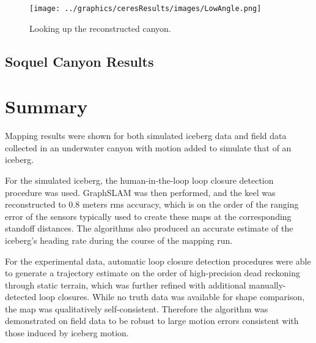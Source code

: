  \begin{figure}[!htb]
   \centering
   \texttt{[image: ../graphics/ceresResults/images/LowAngle.png]} %
   \caption{Looking up the reconstructed canyon.}
   \label{fig:RealDataSolution5}
\end{figure}
\subsection{Soquel Canyon Results}


\section{Summary}

Mapping results were shown for both simulated iceberg data and field data collected in an underwater canyon with motion added to simulate that of an iceberg. 

For the simulated iceberg, the human-in-the-loop loop closure detection procedure was used. GraphSLAM was then performed, and the keel was reconstructed to 0.8 meters rms accuracy, which is on the order of the ranging error of the sensors typically used to create these maps at the corresponding standoff distances. The algorithms also produced an accurate estimate of the iceberg's heading rate during the course of the mapping run.

For the experimental data, automatic loop closure detection procedures were able to generate a trajectory estimate on the order of high-precision dead reckoning through static terrain, which was further refined with additional manually-detected loop closures.  While no truth data was available for shape comparison, the map was qualitatively self-consistent. Therefore the algorithm was demonstrated on field data to be robust to large motion errors consistent with those induced by iceberg motion.


